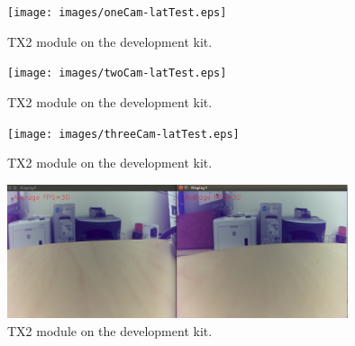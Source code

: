 \documentclass[letterpaper,10pt,serif,draftclsnofoot,onecolumn,compsoc,titlepage]{IEEEtran}
\begin{document}
\begin{figure}[H]
	\centering
	\label{fig:The result of our one-camera latency test.}
	\texttt{[image: images/oneCam-latTest.eps]}
	\caption{TX2 module on the development kit. \label{overflow}}
\end{figure}

\begin{figure}[H]
	\centering
	\label{fig:The result of our two-camera latency test.}
	\texttt{[image: images/twoCam-latTest.eps]}
	\caption{TX2 module on the development kit. \label{overflow}}
\end{figure}

\begin{figure}[H]
	\centering
	\label{fig:The result of our three-camera latency test.}
	\texttt{[image: images/threeCam-latTest.eps]}
	\caption{TX2 module on the development kit. \label{overflow}}
\end{figure}

\begin{figure}[H]
	\centering
	\label{fig:The result of our frame per second test.}
	\includegraphics[width=10cm]{images/fps2.eps}
	\caption{TX2 module on the development kit. \label{overflow}}
\end{figure}

%
%
\end{document}
